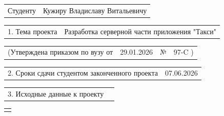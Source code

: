 \documentclass[12pt, А4, twoside]{article}
\begin{document}
\begin{FlushLeft}
\fontsize{12}{0}

    \begin{tabular}{p{1.9cm} p{14.95cm}}
        \textsf{Студенту} &
        \textsf{Кужиру Владиславу Витальевичу} \vspace{0pt} \hline
    \end{tabular}

    \vspace{-0.05 cm}

    \begin{tabular}{p{2.8cm} p{14.05cm}}
        \textsf{1. Тема проекта} &
        \textsf{Разработка серверной части приложения "Такси"} \vspace{0pt} \hline
    \end{tabular}

    \vspace{-0.05 cm}

    \begin{tabular}{p{5.9cm} p{4.8cm} p{0.3cm} p{5.0cm}}
        \textsf{(Утверждена приказом по вузу от} &
        \centering \textsf{29.01.2026} \vspace{1pt} \hline &
        \centering \textsf{№} &
        \centering \textsf{97-C \hspace{0.4cm} )} \hline
    \end{tabular}

    \vspace{-0.05 cm}

    \begin{tabular}{p{9.4cm} p{7.45cm}}
        \textsf{2. Сроки сдачи студентом законченного проекта} &
        \centering \textsf{07.06.2026} \vspace{1pt} \hline
    \end{tabular}

    \vspace{-0.09 cm}

    \begin{tabular}{p{5.7cm} p{11.15cm}}
        \textsf{3. Исходные данные к проекту} &
        \vspace{1pt} \hline
    \end{tabular}

    \begin{tabular}{p{17.25cm}}
        \vspace{0pt} \hline \\
    \end{tabular}

    \vspace{-0.1 cm}


\end{FlushLeft}
\end{document}
